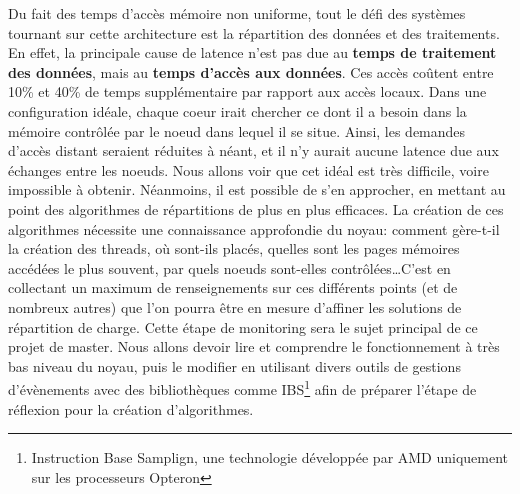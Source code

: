   Du fait des temps d'accès mémoire non uniforme, tout le défi des systèmes
  tournant sur cette architecture est la répartition des données et des
  traitements. En effet, la principale cause de latence n'est pas due au
  \textbf{temps de traitement des données}, mais au \textbf{temps d'accès aux
    données}. Ces accès coûtent entre 10\% et 40\% de temps supplémentaire par
  rapport aux accès locaux.\cite{Lepers2014} Dans une configuration idéale,
  chaque coeur irait chercher ce dont il a besoin dans la mémoire contrôlée par
  le noeud dans lequel il se situe. Ainsi, les demandes d'accès distant seraient
  réduites à néant, et il n'y aurait aucune latence due aux échanges entre les
  noeuds. Nous allons voir que cet idéal est très difficile, voire impossible à
  obtenir. Néanmoins, il est possible de s'en approcher, en mettant au point des
  algorithmes de répartitions de plus en plus efficaces. La création de ces
  algorithmes nécessite une connaissance approfondie du noyau: comment gère-t-il
  la création des threads, où sont-ils placés, quelles sont les pages mémoires
  accédées le plus souvent, par quels noeuds sont-elles contrôlées\ldots C'est
  en collectant un maximum de renseignements sur ces différents points (et de
  nombreux autres) que l'on pourra être en mesure d'affiner les solutions de
  répartition de charge. Cette étape de monitoring sera le sujet principal de ce
  projet de master. Nous allons devoir lire et comprendre le fonctionnement à
  très bas niveau du noyau, puis le modifier en utilisant divers outils de
  gestions d'évènements avec des bibliothèques comme IBS\footnote{Instruction
    Base Samplign, une technologie développée par AMD uniquement sur les
    processeurs Opteron} afin de préparer l'étape de réflexion pour la création
  d'algorithmes.
